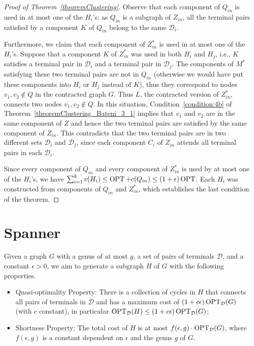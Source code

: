 \begin{proof}[Proof of Theorem~\ref{theoremClustering}]
Observe that each component of \(Q_{in}\) is used in at most one of the \(H_i\)’s: as \(Q_{in}\) is a subgraph of \(Z_{in}\), all the terminal pairs satisfied by a component \(K\) of \(Q_{in}\) belong to the same \(\mathcal{D}_i\).

Furthermore, we claim that each component of \(Z_{in}^\ast\) is used in at most one of the \(H_i\)'s. Suppose that a component \(K\) of \(Z_{in}^\ast\) was used in both \(H_i\) and \(H_j\), i.e., \(K\) satisfies a terminal pair in \(\mathcal{D}_i\) and a terminal pair in \(\mathcal{D}_j\). The components of \(M^\ast\) satisfying these two terminal pairs are not in \(Q_{in}\) (otherwise we would have put these components into \(H_i\) or \(H_j\) instead of \(K\)), thus they correspond to nodes \(v_1, v_2 \notin Q\) in the contracted graph \(G\). Thus \(L\), the contracted version of \(Z_{in}^\ast\), connects two nodes \(v_1, v_2 \notin Q\). In this situation, Condition~\eqref{condition:4b} of Theorem~\ref{theoremClustering_Bateni_3_1} implies that \(v_1\) and \(v_2\) are in the same component of \(Z\) and hence the two terminal pairs are satisfied by the same component of \(Z_{in}\). This contradicts that the two terminal pairs are in two different sets \(\mathcal{D}_i\) and \(\mathcal{D}_j\), since each component \(C_i\) of \(Z_{in}\) attends all terminal pairs in each \(\mathcal{D}_i\).

Since every component of \(Q_{in}\) and every component of \(Z_{in}^\ast\) is used by at most one of the \(H_i\)'s, we have \(\sum_{i=1}^k c(H_i) \leq \operatorname{\textrm{OPT}} + c(Q_{in}) \leq (1 + \epsilon) \operatorname{\textrm{OPT}}\). Each \(H_i\) was constructed from components of \(Q_{in}\) and \(Z_{in}^\ast\), which establishes the last condition of the theorem.

\end{proof}


\section{Spanner}
\label{section:spanner}

Given a graph \(G\) with a genus of at most \(g\), a set of pairs of terminals \(\mathcal{D}\), and a constant \(\epsilon > 0\), we aim to generate a subgraph \(H\) of \(G\) with the following properties. 

\begin{itemize}
    \item Quasi-optimality Property: There is a collection of cycles in \(H\) that connects all pairs of terminals in \(\mathcal{D}\) and has a maximum cost of \((1 + c \epsilon) \operatorname{\textrm{OPT}}_{\mathcal{D}}(G)\) (with \(c\) constant), in particular \(\operatorname{\textrm{OPT}}_{\mathcal{D}}(H) \leq (1 + c \epsilon) \operatorname{\textrm{OPT}}_{\mathcal{D}}(G)\);
    \item Shortness Property: The total cost of \(H\) is at most \(f(\epsilon, g) \cdot \operatorname{\textrm{OPT}}_{\mathcal{D}}(G)\), where \(f(\epsilon, g)\) is a constant dependent on \(\epsilon\) and the genus \(g\) of \(G\).
\end{itemize}

